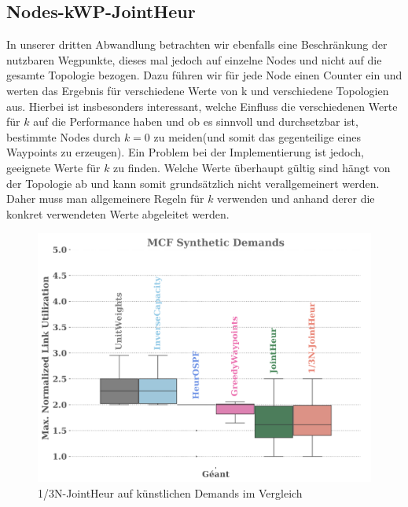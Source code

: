 \documentclass[sigconf]{acmart}
\begin{document}
\subsection{Nodes-kWP-JointHeur}
In unserer dritten Abwandlung betrachten wir ebenfalls eine Beschränkung der nutzbaren Wegpunkte, dieses mal jedoch auf einzelne Nodes und nicht auf die gesamte Topologie bezogen.
Dazu führen wir für jede Node einen Counter ein und werten das Ergebnis für verschiedene Werte von k und verschiedene Topologien aus. Hierbei ist insbesonders interessant, welche Einfluss die verschiedenen Werte für $k$ auf die Performance haben und ob es sinnvoll und durchsetzbar ist, bestimmte Nodes durch $k=0$ zu meiden(und somit das gegenteilige eines Waypoints zu erzeugen).
Ein Problem bei der Implementierung ist jedoch, geeignete Werte für $k$ zu finden. Welche Werte überhaupt gültig sind hängt von der Topologie ab und kann somit grundsätzlich nicht verallgemeinert werden. Daher muss man allgemeinere Regeln für $k$ verwenden und anhand derer die konkret verwendeten Werte abgeleitet werden.

\begin{figure}[h]
  \centering
  \includegraphics[width=\linewidth]{abbildungen/a31}
  \caption{1/3N-JointHeur auf künstlichen Demands im Vergleich}
\end{figure}
\end{document}
